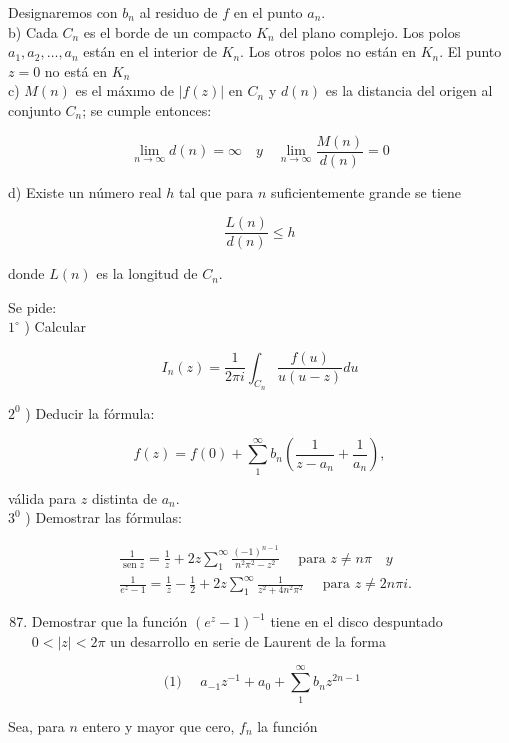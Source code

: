 \documentclass[10pt]{article}
\theoremstyle{plain}
\theoremstyle{definition}
\theoremstyle{remark}
\begin{document}
Designaremos con $b_{n}$ al residuo de $f$ en el punto $a_{n}$.\\
b) Cada $C_{n}$ es el borde de un compacto $K_{n}$ del plano complejo. Los polos $a_{1}, a_{2}, \ldots, a_{n}$ están en el interior de $K_{n}$. Los otros polos no están en $K_{n}$. El punto $z=0$ no está en $K_{n}$\\
c) $M(n)$ es el máxımo de $|f(z)|$ en $C_{n}$ y $d(n)$ es la distancia del origen al conjunto $C_{n}$; se cumple entonces:

$$
\lim _{n \rightarrow \infty} d(n)=\infty \quad y \quad \lim _{n \rightarrow \infty} \frac{M(n)}{d(n)}=0
$$

d) Existe un número real $h$ tal que para $n$ suficientemente grande se tiene

$$
\frac{L(n)}{d(n)} \leqslant h
$$

donde $L(n)$ es la longitud de $C_{n}$.

Se pide:\\
$1^{\circ}$ ) Calcular

$$
I_{n}(z)=\frac{1}{2 \pi i} \int_{C_{n}} \frac{f(u)}{u(u-z)} d u
$$

$2^{0}$ ) Deducir la fórmula:

$$
f(z)=f(0)+\sum_{1}^{\infty} b_{n}\left(\frac{1}{z-a_{n}}+\frac{1}{a_{n}}\right),
$$

válida para $z$ distinta de $a_{n}$.\\
$3^{0}$ ) Demostrar las fórmulas:

$$
\begin{aligned}
& \frac{1}{\operatorname{sen} z}=\frac{1}{z}+2 z \sum_{1}^{\infty} \frac{(-1)^{n-1}}{n^{2} \pi^{2}-z^{2}} \quad \text { para } z \neq n \pi \quad y \\
& \frac{1}{e^{z}-1}=\frac{1}{z}-\frac{1}{2}+2 z \sum_{1}^{\infty} \frac{1}{z^{2}+4 n^{2} \pi^{2}} \quad \text { para } z \neq 2 n \pi i .
\end{aligned}
$$

\begin{enumerate}
  \setcounter{enumi}{86}
  \item Demostrar que la función $\left(e^{z}-1\right)^{-1}$ tiene en el disco despuntado $0<|z|<2 \pi$ un desarrollo en serie de Laurent de la forma
\end{enumerate}

$$
\text { (1) } \quad a_{-1} z^{-1}+a_{0}+\sum_{1}^{\infty} b_{n} z^{2 n-1}
$$

Sea, para $n$ entero y mayor que cero, $f_{n}$ la función
\end{document}

